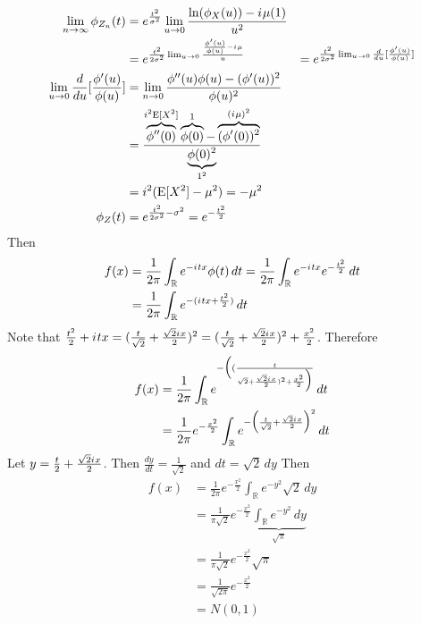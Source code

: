 \documentclass[12pt]{article}
\newcommand{\expected}[1]{\mathrm{E}[#1]}
\renewcommand{\i}{{i\mkern1mu}}
\begin{document}
$$ \begin{aligned} \lim_{n \to \infty} \phi_{Z_n}(t) &= e^{\frac{t^2}{\sigma^2}} \lim_{u \to 0} \frac{\ln(\phi_X(u)) - \i \mu (1)}{u^2} \\ &= e^{\frac{t^2}{2 \sigma^2} \lim_{u \to 0} \frac{\frac{\phi'(u)}{\phi(u)} - \i \mu}{u}} &= e^{\frac{t^2}{2\sigma^2} \lim_{u \to 0} \frac{d}{du} [\frac{\phi'(u)}{\phi(u)}]} \\  
\lim_{u \to 0} \frac{d}{du} [ \frac{\phi'(u)}{\phi(u)}] &= \lim_{n \to 0} \frac{\phi''(u)\phi(u) - (\phi'(u))^2}{\phi(u)^2} \\ &= \frac{\overbrace{\phi''(0)}^{i^2 \expected{X^2}} \overbrace{\phi(0)}^1 - \overbrace{(\phi'(0))^2}^{(\i \mu)^2}}{\underbrace{\phi(0)^2}_{1^2}} \\ &= i^2(\expected{X^2} - \mu^2) = -\mu^2 \\ \phi_Z(t) &= e^{\frac{t^2}{2\sigma^2}{-\sigma^2}} = e^{-\frac{t^2}{2}} \end{aligned} $$ 
Then $$ \begin{aligned} 
f(x) &= \frac{1}{2\pi} \int_{\mathbb{R}} e^{- \i tx} \phi(t) \, dt = \frac{1}{2\pi} \int_{\mathbb{R}} e^{- \i tx} e^{-\frac{t^2}{2}} \, dt \\ &= \frac{1}{2\pi} \int_{\mathbb{R}} e^{-(\i tx + \frac{t^2}{2})} \, dt \end{aligned} $$ 
Note that $\frac{t^2}{2} + \i tx = ( \frac{t}{\sqrt{2}} + \frac{\sqrt{2} \i x}{2})^2 = ( \frac{t}{\sqrt{2}} + \frac{\sqrt{2} \i x}{2})^2 + \frac{x^2}{2}$. Therefore $$ \begin{aligned} 
f(x) &= \frac{1}{2\pi} \int_{\mathbb{R}} e^{-\Big( (\frac{t}{\sqrt{2} + \frac{\sqrt{2} \i x}{2})^2 + \frac{x^2}{2}\Big)}} \, dt \\ &= \frac{1}{2\pi} e^{-\frac{x^2}{2}} \int_{\mathbb{R}} e^{- \Big( \frac{t}{\sqrt{2}} + \frac{\sqrt{2} \i x}{2} \Big)^2} \, dt \end{aligned} $$ 
Let $y = \frac{t}{2} + \frac{\sqrt{2} \i x}{2}$. Then $\frac{dy}{dt} = \frac{1}{\sqrt{2}}$ and $dt = \sqrt{2} \, dy $ Then $$ \begin{aligned} 
f(x) &= \frac{1}{2\pi} e^{-\frac{x^2}{2}} \int_{\mathbb{R}} e^{-y^2} \sqrt{2} \, dy \\ &= \frac{1}{\pi \sqrt{2}} e^{-\frac{x^2}{2}} \underbrace{\int_{\mathbb{R}} e^{-y^2} \, dy}_{\sqrt{\pi}} \\ &= \frac{1}{\pi \sqrt{2}} e^{-\frac{x^2}{2}} \sqrt{\pi} \\ &= \frac{1}{\sqrt{2\pi}} e^{-\frac{x^2}{2}} \\ &= N(0, 1) \end{aligned} $$ 
\end{document}
